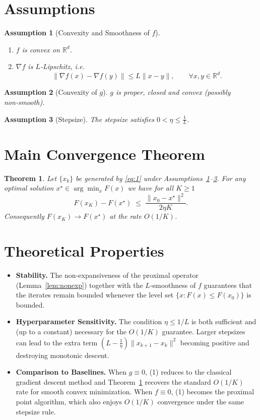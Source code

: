 \documentclass{article}
\newtheorem{theorem}{Theorem}
\newtheorem{assumption}{Assumption}
\newcommand{\R}{\mathbb{R}}
\begin{document}
\newpage

\section*{Assumptions}
\begin{assumption}[Convexity and Smoothness of $f$]\label{ass:convex-smooth}
\begin{enumerate}[label=(\alph*)]
\item $f$ is convex on $\R^{d}$.
\item $\nabla f$ is $L$‑Lipschitz, i.e.
\[
\|\nabla f(x)-\nabla f(y)\|\le L\|x-y\|,\qquad\forall x,y\in\R^{d}.
\]
\end{enumerate}
\end{assumption}
\begin{assumption}[Convexity of $g$]\label{ass:g}
$g$ is proper, closed and convex (possibly non‑smooth).
\end{assumption}
\begin{assumption}[Stepsize]\label{ass:stepsize}
The stepsize satisfies $0<\eta\le\frac{1}{L}$.
\end{assumption}

\section*{Main Convergence Theorem}
\begin{theorem}\label{thm:rate}
Let $\{x_{k}\}$ be generated by \eqref{eq:1} under Assumptions~\ref{ass:convex-smooth}–\ref{ass:stepsize}.  
For any optimal solution $x^{\star}\in\arg\min_{x}F(x)$ we have for all $K\ge1$
\[
F(x_{K})-F(x^{\star})\;\le\;\frac{\|x_{0}-x^{\star}\|^{2}}{2\eta K}.
\tag{2}
\]
Consequently $F(x_{K})\to F(x^{\star})$ at the rate $O(1/K)$.
\end{theorem}

\section*{Theoretical Properties}
\begin{itemize}
\item \textbf{Stability.}  The non‑expansiveness of the proximal operator (Lemma~\ref{lem:nonexp}) together with the $L$‑smoothness of $f$ guarantees that the iterates remain bounded whenever the level set $\{x:F(x)\le F(x_{0})\}$ is bounded.
\item \textbf{Hyperparameter Sensitivity.}  The condition $\eta\le 1/L$ is both sufficient and (up to a constant) necessary for the $O(1/K)$ guarantee.  Larger stepsizes can lead to the extra term $(L-\frac{1}{\eta})\|x_{k+1}-x_{k}\|^{2}$ becoming positive and destroying monotonic descent.
\item \textbf{Comparison to Baselines.}  When $g\equiv0$, (1) reduces to the classical gradient descent method and Theorem~\ref{thm:rate} recovers the standard $O(1/K)$ rate for smooth convex minimization.  When $f\equiv0$, (1) becomes the proximal point algorithm, which also enjoys $O(1/K)$ convergence under the same stepsize rule.
\end{itemize}
\end{document}
